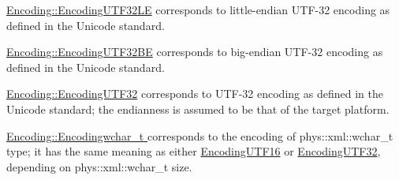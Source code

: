 \begin{DoxyItemize}
\item \hyperlink{namespacephys_1_1xml_a420f5de782438f88160321385bea2015}{Encoding::EncodingUTF32LE} corresponds to little-\/endian UTF-\/32 encoding as defined in the Unicode standard.
\item \hyperlink{namespacephys_1_1xml_a420f5de782438f88160321385bea2015}{Encoding::EncodingUTF32BE} corresponds to big-\/endian UTF-\/32 encoding as defined in the Unicode standard.
\item \hyperlink{namespacephys_1_1xml_a420f5de782438f88160321385bea2015}{Encoding::EncodingUTF32} corresponds to UTF-\/32 encoding as defined in the Unicode standard; the endianness is assumed to be that of the target platform.
\item \hyperlink{namespacephys_1_1xml_a420f5de782438f88160321385bea2015}{Encoding::Encodingwchar\_\-t } corresponds to the encoding of phys::xml::wchar\_\-t type; it has the same meaning as either \hyperlink{namespacephys_1_1xml_a420f5de782438f88160321385bea2015}{EncodingUTF16} or \hyperlink{namespacephys_1_1xml_a420f5de782438f88160321385bea2015}{EncodingUTF32}, depending on phys::xml::wchar\_\-t size.
\end{DoxyItemize}

